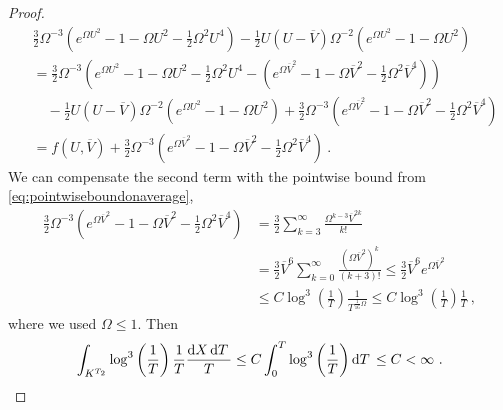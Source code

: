 \documentclass[a4paper]{amsart}
\providecommand{\dint}[1]{ {\rm d} #1\,}
\begin{document}
\begin{proof}
\begin{equation*}
    \begin{split}
      &\frac{3}{2} \Omega^{-3}
      \left(
      e^{\Omega U^2} - 1 - \Omega U^2 - \frac{1}{2} \Omega^2 U^4
      \right)
      -
      \frac{1}{2}
      U (U - \overline{V})
      \Omega^{-2}
      \left(
      e^{\Omega U^2} - 1 - \Omega U^2
      \right) \\
      &=
      \frac{3}{2} \Omega^{-3}
      \left(
      e^{\Omega U^2} - 1 - \Omega U^2 - \frac{1}{2} \Omega^2 U^4
      -
      (e^{\Omega \overline{V}^2} - 1 - \Omega \overline{V}^2 -
      \frac{1}{2} \Omega^2 \overline{V}^4)
      \right)
      \\
      &\quad
      -
      \frac{1}{2}
      U (U - \overline{V})
      \Omega^{-2}
      \left(
      e^{\Omega U^2} - 1 - \Omega U^2
      \right)
      +
      \frac{3}{2} \Omega^{-3}
      (e^{\Omega \overline{V}^2} - 1 - \Omega \overline{V}^2 -
      \frac{1}{2} \Omega^2 \overline{V}^4) 
      \\
      &=
      f(U, \overline{V})
      +
      \frac{3}{2} \Omega^{-3}
      (e^{\Omega \overline{V}^2} - 1 - \Omega \overline{V}^2 -
      \frac{1}{2} \Omega^2 \overline{V}^4) \ .
    \end{split}
  \end{equation*}
  We can compensate the second term with the pointwise bound from
  \eqref{eq:pointwiseboundonaverage},
  \begin{equation*}
    \begin{split}
      \frac{3}{2} \Omega^{-3}
      (e^{\Omega \overline{V}^2} - 1 - \Omega \overline{V}^2 -
      \frac{1}{2} \Omega^2 \overline{V}^4)
      &=
      \frac{3}{2} \sum_{k = 3}^\infty
      \frac{\Omega^{k - 3} \overline{V}^{2 k}}{k!} 
      \\
      &=
      \frac{3}{2} \overline{V}^6
      \sum_{k = 0}^\infty \frac{(\Omega \overline{V}^{2})^k}{(k + 3)!} 
      \leq
      \frac{3}{2} \overline{V}^6 e^{\Omega \overline{V}^2} 
      \\
      &\leq
      C \log^3 \left( \frac{1}{T} \right) \frac{1}{T^{\frac{1}{16} \Omega}} 
      \leq
      C \log^3 \left( \frac{1}{T} \right) \frac{1}{T} \ ,
    \end{split}
  \end{equation*}
  where we used $\Omega \leq 1$. Then
  \begin{equation*}
    \int_{K^{T_2}}
    \log^3 \left( \frac{1}{T} \right) \frac{1}{T}
    \frac{\dint{X} \dint{T}}{T}
    \leq
    C \int_0^T \log^3 \left( \frac{1}{T} \right) \dint{T}
    \leq
    C
    <
    \infty \ .

\end{equation*}
\end{proof}
\end{document}
